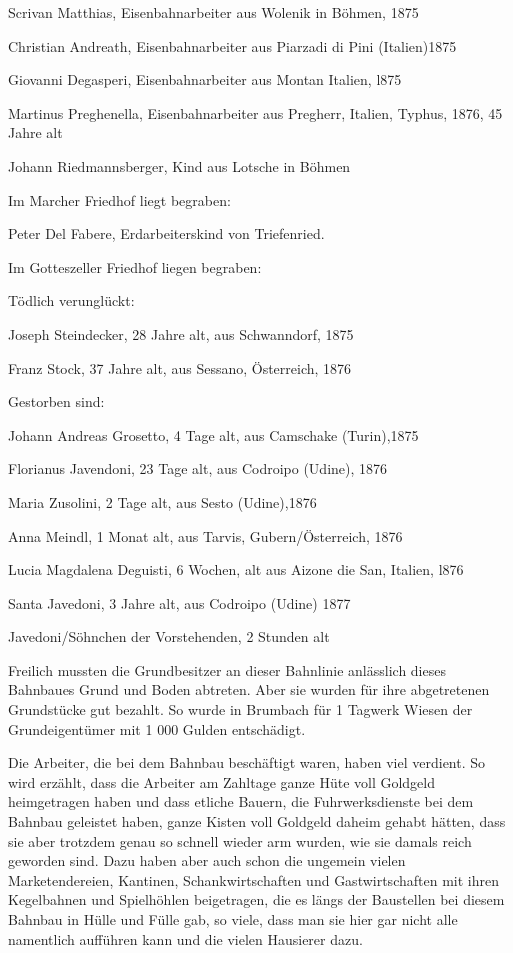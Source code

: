 \documentclass[12pt,a4pager]{book}
\begin{document}
Scrivan Matthias, Eisenbahnarbeiter aus Wolenik in Böhmen, 1875

Christian Andreath, Eisenbahnarbeiter aus Piarzadi di Pini (Italien)1875

Giovanni Degasperi, Eisenbahnarbeiter aus Montan Italien, l875

Martinus Preghenella, Eisenbahnarbeiter aus Pregherr, Italien, Typhus, 1876, 45
Jahre alt

Johann Riedmannsberger, Kind aus Lotsche in Böhmen

Im Marcher Friedhof liegt begraben:

Peter Del Fabere, Erdarbeiterskind von Triefenried.

Im Gotteszeller Friedhof liegen begraben:

Tödlich verunglückt:

Joseph Steindecker, 28 Jahre alt, aus Schwanndorf, 1875

Franz Stock, 37 Jahre alt, aus Sessano, Österreich, 1876

Gestorben sind:

Johann Andreas Grosetto, 4 Tage alt, aus Camschake (Turin),1875

Florianus Javendoni, 23 Tage alt, aus Codroipo (Udine), 1876

Maria Zusolini, 2 Tage alt, aus Sesto (Udine),1876

Anna Meindl, 1 Monat alt, aus Tarvis, Gubern/Österreich, 1876

Lucia Magdalena Deguisti, 6 Wochen, alt aus Aizone die San, Italien, l876

Santa Javedoni, 3 Jahre alt, aus Codroipo (Udine) 1877

Javedoni/Söhnchen der Vorstehenden, 2 Stunden alt

Freilich mussten die Grundbesitzer an dieser Bahnlinie anlässlich dieses
Bahnbaues Grund und Boden abtreten. Aber sie wurden für ihre abgetretenen
Grundstücke gut bezahlt. So wurde in Brumbach für 1 Tagwerk Wiesen der
Grundeigentümer mit 1 000 Gulden entschädigt.

Die Arbeiter, die bei dem Bahnbau beschäftigt waren, haben viel verdient. So
wird erzählt, dass die Arbeiter am Zahltage ganze Hüte voll Goldgeld
heimgetragen haben und dass etliche Bauern, die Fuhrwerksdienste bei dem Bahnbau
geleistet haben, ganze Kisten voll Goldgeld daheim gehabt hätten, dass sie aber
trotzdem genau so schnell wieder arm wurden, wie sie damals reich geworden sind.
Dazu haben aber auch schon die ungemein vielen Marketendereien, Kantinen,
Schankwirtschaften und Gastwirtschaften mit ihren Kegelbahnen und Spielhöhlen
beigetragen, die es längs der Baustellen bei diesem Bahnbau in Hülle und Fülle
gab, so viele, dass man sie hier gar nicht alle namentlich aufführen kann und
die vielen Hausierer dazu.
\end{document}
